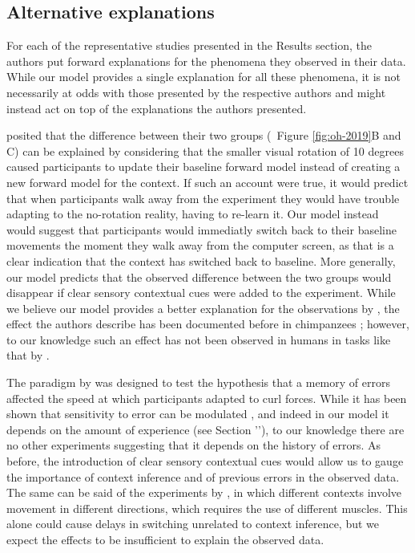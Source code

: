 \documentclass[a4paper,doc,floatsintext,natbib]{apa6}
\def \fref #1{Figure \ref{#1}}     %
\def \sref #1{Section '\nameref{#1}'}    %
\begin{document}
\subsection{Alternative explanations}
For each of the representative studies presented in the Results section, the authors put forward explanations for the phenomena they observed in their data. While our model provides a single explanation for all these phenomena, it is not necessarily at odds with those presented by the respective authors and might instead act on top of the explanations the authors presented.

\cite{Oh_Minimizing_2019} posited that the difference between their two groups (~\fref{fig:oh-2019}B and C) can be explained by considering that the smaller visual rotation of 10 degrees caused participants to update their baseline forward model instead of creating a new forward model for the context. If such an account were true, it would predict that when participants walk away from the experiment they would have trouble adapting to the no-rotation reality, having to re-learn it. Our model instead would suggest that participants would immediatly switch back to their baseline movements the moment they walk away from the computer screen, as that is a clear indication that the context has switched back to baseline. More generally, our model predicts that the observed difference between the two groups would disappear if clear sensory contextual cues were added to the experiment. While we believe our model provides a better explanation for the observations by \cite{Oh_Minimizing_2019}, the effect the authors describe has been documented before in chimpanzees \citep{Kojima_Memory_2004}; however, to our knowledge such an effect has not been observed in humans in tasks like that by \cite{Oh_Minimizing_2019}.

The paradigm by \cite{Herzfeld_memory_2014} was designed to test the hypothesis that a memory of errors affected the speed at which participants adapted to curl forces. While it has been shown that sensitivity to error can be modulated \cite{Marko_Sensitivity_2012}, and indeed in our model it depends on the amount of experience (see \sref{sec:interpreting-hyperparameters}), to our knowledge there are no other experiments suggesting that it depends on the history of errors. As before, the introduction of clear sensory contextual cues would allow us to gauge the importance of context inference and of previous errors in the observed data. The same can be said of the experiments by \cite{Davidson_Scaling_2004}, in which different contexts involve movement in different directions, which requires the use of different muscles. This alone could cause delays in switching unrelated to context inference, but we expect the effects to be insufficient to explain the observed data.
\end{document}
